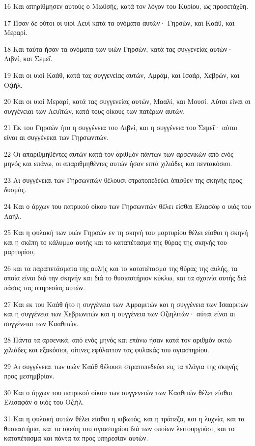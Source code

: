 \par 16 Και απηρίθμησεν αυτούς ο Μωϋσής, κατά τον λόγον του Κυρίου, ως προσετάχθη.
\par 17 Ήσαν δε ούτοι οι υιοί Λευΐ κατά τα ονόματα αυτών· Γηρσών, και Καάθ, και Μεραρί.
\par 18 Και ταύτα ήσαν τα ονόματα των υιών Γηρσών, κατά τας συγγενείας αυτών· Λιβνί, και Σεμεΐ.
\par 19 Και οι υιοί Καάθ, κατά τας συγγενείας αυτών, Αμράμ, και Ισαάρ, Χεβρών, και Οζιήλ.
\par 20 Και οι υιοί Μεραρί, κατά τας συγγενείας αυτών, Μααλί, και Μουσί. Αύται είναι αι συγγένειαι των Λευϊτών, κατά τους οίκους των πατέρων αυτών.
\par 21 Εκ του Γηρσών ήτο η συγγένεια του Λιβνί, και η συγγένεια του Σεμεΐ· αύται είναι αι συγγένειαι των Γηρσωνιτών.
\par 22 Οι απαριθμηθέντες αυτών κατά τον αριθμόν πάντων των αρσενικών από ενός μηνός και επάνω, οι απαριθμηθέντες αυτών ήσαν επτά χιλιάδες και πεντακόσιοι.
\par 23 Αι συγγένειαι των Γηρσωνιτών θέλουσι στρατοπεδεύει όπισθεν της σκηνής προς δυσμάς.
\par 24 Και ο άρχων του πατρικού οίκου των Γηρσωνιτών θέλει είσθαι Ελιασάφ ο υιός του Λαήλ.
\par 25 Και η φυλακή των υιών Γηρσών εν τη σκηνή του μαρτυρίου θέλει είσθαι η σκηνή και η σκέπη το κάλυμμα αυτής και το καταπέτασμα της θύρας της σκηνής του μαρτυρίου,
\par 26 και τα παραπετάσματα της αυλής και το καταπέτασμα της θύρας της αυλής, τα οποία είναι διά την σκηνήν και διά το θυσιαστήριον κύκλω, και τα σχοινία αυτής διά πάσας τας υπηρεσίας αυτών.
\par 27 Και εκ του Καάθ ήτο η συγγένεια των Αμραμιτών και η συγγένεια των Ισααριτών και η συγγένεια των Χεβρωνιτών και η συγγένεια των Οζιηλιτών· αύται είναι αι συγγένειαι των Κααθιτών.
\par 28 Πάντα τα αρσενικά, από ενός μηνός και επάνω ήσαν κατά τον αριθμόν οκτώ χιλιάδες και εξακόσιοι, οίτινες εφύλαττον τας φυλακάς του αγιαστηρίου.
\par 29 Αι συγγένειαι των υιών Καάθ θέλουσι στρατοπεδεύει εις τα πλάγια της σκηνής προς μεσημβρίαν.
\par 30 Και ο άρχων του πατρικού οίκου των συγγενειών των Κααθιτών θέλει είσθαι Ελισαφάν ο υιός του Οζιήλ.
\par 31 Και η φυλακή αυτών θέλει είσθαι η κιβωτός, και η τράπεζα, και η λυχνία, και τα θυσιαστήρια, και τα σκεύη του αγιαστηρίου διά των οποίων λειτουργούσι, και το καταπέτασμα και πάντα τα προς υπηρεσίαν αυτών.
